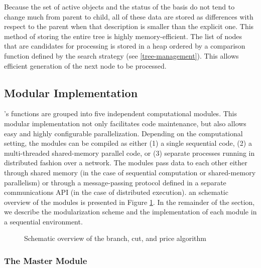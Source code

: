 Because the set of active objects and the status of the basis do not
tend to change much from parent to child, all of these data are stored
as differences with respect to the parent when that description is
smaller than the explicit one. This method of storing the entire tree
is highly memory-efficient. The list of nodes that are candidates for
processing is stored in a heap ordered by a comparison function
defined by the search strategy (see \ref{tree-management}). This
allows efficient generation of the next node to be processed.

\subsection{Modular Implementation}

\BB's functions are grouped into five independent computational
modules. This modular implementation not only facilitates code
maintenance, but also allows easy and highly configurable
parallelization. Depending on the computational setting, the modules
can be compiled as either (1) a single sequential code, (2) a
multi-threaded shared-memory parallel code, or (3) separate processes
running in distributed fashion over a network. The modules pass data
to each other either through shared memory (in the case of sequential
computation or shared-memory parallelism) or through a message-passing
protocol defined in a separate communications API (in the case of
distributed execution). an schematic overview of the modules is
presented in Figure \ref{overview}. In the remainder of the section,
we describe the modularization scheme and the implementation of each
module in a sequential environment. 

\begin{figure}
\centering
{}
\caption{Schematic overview of the branch, cut, and price algorithm}
\label{overview}
\end{figure}

\subsubsection{The Master Module}
\label{master-process}

